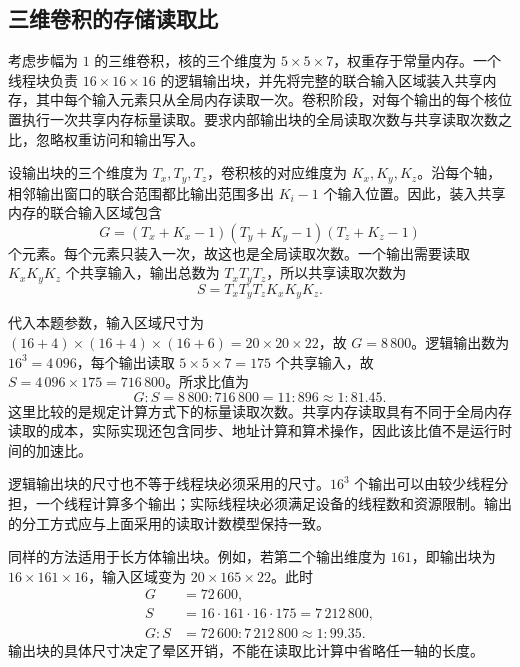 \subsection{三维卷积的存储读取比}
\label{l11:subsec:three_dimensional_reads}

考虑步幅为 $1$ 的三维卷积，核的三个维度为 $5\times5\times7$，权重存于常量内存。一个线程块负责 $16\times16\times16$ 的逻辑输出块，并先将完整的联合输入区域装入共享内存，其中每个输入元素只从全局内存读取一次。卷积阶段，对每个输出的每个核位置执行一次共享内存标量读取。要求内部输出块的全局读取次数与共享读取次数之比，忽略权重访问和输出写入。

设输出块的三个维度为 $T_x,T_y,T_z$，卷积核的对应维度为 $K_x,K_y,K_z$。沿每个轴，相邻输出窗口的联合范围都比输出范围多出 $K_i-1$ 个输入位置。因此，装入共享内存的联合输入区域包含
\begin{equation}
  G=(T_x+K_x-1)(T_y+K_y-1)(T_z+K_z-1)
  \label{l11:eq:three_dim_global}
\end{equation}
个元素。每个元素只装入一次，故这也是全局读取次数。一个输出需要读取 $K_xK_yK_z$ 个共享输入，输出总数为 $T_xT_yT_z$，所以共享读取次数为
\begin{equation}
  S=T_xT_yT_zK_xK_yK_z.
  \label{l11:eq:three_dim_shared}
\end{equation}

代入本题参数，输入区域尺寸为 $(16+4)\times(16+4)\times(16+6)=20\times20\times22$，故 $G=8\,800$。逻辑输出数为 $16^3=4\,096$，每个输出读取 $5\times5\times7=175$ 个共享输入，故 $S=4\,096\times175=716\,800$。所求比值为
\begin{equation}
  G:S=8\,800:716\,800=11:896
  \approx \boxed{1:81.45}.
  \label{l11:eq:three_dim_ratio}
\end{equation}
这里比较的是规定计算方式下的标量读取次数。共享内存读取具有不同于全局内存读取的成本，实际实现还包含同步、地址计算和算术操作，因此该比值不是运行时间的加速比。

逻辑输出块的尺寸也不等于线程块必须采用的尺寸。$16^3$ 个输出可以由较少线程分担，一个线程计算多个输出；实际线程块必须满足设备的线程数和资源限制。输出的分工方式应与上面采用的读取计数模型保持一致。

同样的方法适用于长方体输出块。例如，若第二个输出维度为 $161$，即输出块为 $16\times161\times16$，输入区域变为 $20\times165\times22$。此时
\begin{equation}
\begin{aligned}
  G&=72\,600,\\
  S&=16\cdot161\cdot16\cdot175=7\,212\,800,\\
  G:S&=72\,600:7\,212\,800\approx1:99.35.
\end{aligned}
\label{l11:eq:three_dim_rectangular}
\end{equation}
输出块的具体尺寸决定了晕区开销，不能在读取比计算中省略任一轴的长度。

